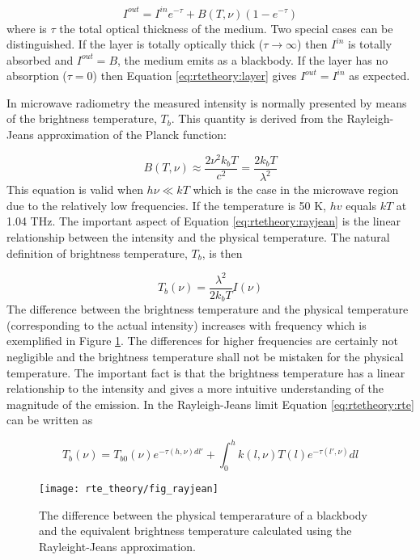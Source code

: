  \begin{equation}
   I^{out} = I^{in}e^{-\tau} + B(T,\nu)(1-e^{-\tau})
  \label{eq:rtetheory:layer}
 \end{equation}  
 where is $\tau$ the total optical thickness of the medium. Two
 special cases can be distinguished. If the layer is totally optically
 thick ($\tau \to \infty$) then $I^{in}$ is totally absorbed and
 $I^{out} = B$, the medium emits as a blackbody. If the layer has no
 absorption ($\tau=0$) then Equation \ref{eq:rtetheory:layer} gives
 $I^{out} = I^{in}$ as expected.
 
 In microwave radiometry the measured intensity is normally presented
 by means of the brightness temperature, $T_b$. This quantity is
 derived from the Rayleigh-Jeans approximation of the Planck function:

 \begin{equation}
   B(T,\nu) \approx \frac{2\nu^2k_bT}{c^2} = \frac{2k_bT}{\lambda^2}
  \label{eq:rtetheory:rayjean}
 \end{equation}  
 This equation is valid when $h\nu \ll kT$ which is the case in the
 microwave region due to the relatively low frequencies. If the
 temperature is 50 K, $hv$ equals $kT$ at 1.04 THz. The important
 aspect of Equation \ref{eq:rtetheory:rayjean} is the linear relationship
 between the intensity and the physical temperature. The natural
 definition of brightness temperature, $T_b$, is then

 \begin{equation}
   T_b(\nu) = \frac{\lambda^2}{2k_bT} I(\nu)
  \label{eq:rtetheory:tb}
 \end{equation}  
 The difference between the brightness temperature and the physical
 temperature (corresponding to the actual intensity) increases with
 frequency which is exemplified in Figure \ref{fig:rtetheory:rayjean}. The
 differences for higher frequencies are certainly not negligible and
 the brightness temperature shall not be mistaken for the physical
 temperature. The important fact is that the brightness temperature
 has a linear relationship to the intensity and gives a more intuitive
 understanding of the magnitude of the emission. In the Rayleigh-Jeans
 limit Equation \ref{eq:rtetheory:rte} can be written as

 \begin{equation}
   T_b(\nu) = T_{b0}(\nu)e^{-\tau(h,\nu)dl'} + 
     \int^h_0{k(l,\nu)T(l) e^{-\tau(l',\nu)} dl}
  \label{eq:rtetheory:rte_tb}
 \end{equation}  

 \begin{figure}
  \begin{center}
    \texttt{[image: rte\_theory/fig\_rayjean]}
    \caption{The difference between the physical temperarature of a 
             blackbody and the equivalent brightness temperature
             calculated using the Rayleight-Jeans approximation.}
    \label{fig:rtetheory:rayjean}
  \end{center}
 \end{figure}   

